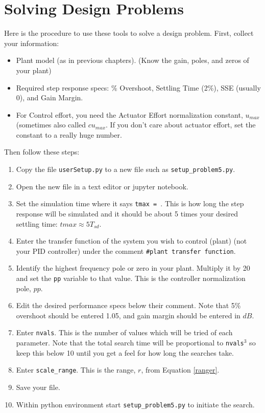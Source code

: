\section{Solving Design Problems}


Here is the procedure to use these tools to solve a design problem.
First, collect your information:
\begin{itemize}
  \item  Plant model (as in previous chapters). (Know the gain, poles, and zeros of your plant)
  \item  Required step response specs:  \% Overshoot, Settling Time (2\%), SSE (usually 0), and Gain Margin.
  \item  For Control effort, you need the Actuator Effort normalization constant, $u_{max}$ (sometimes also called $cu_{max}$.   If you don't care about actuator effort, set the constant to a really huge number.
\end{itemize}

Then follow these steps:	%

\begin{enumerate}
  \item Copy the file {\tt userSetup.py} to a new file such as {\tt setup\_problem5.py}.
  \item Open the new file in a text editor or jupyter notebook.
  \item Set the simulation time where it says {\tt tmax = }.
This is how long the step response will be simulated and it should be about 5 times your desired settling time: $tmax \approx 5T_{sd}$.
  \item Enter the transfer function of the system you wish to control (plant) (not your PID controller) under the comment {\tt \#plant transfer function}.
  \item Identify the highest frequency pole or zero in your plant.  Multiply it by 20 and set the {\tt pp} variable to that value. This is the controller normalization pole, $pp$.
  \item Edit the desired performance specs below their comment.  Note that 5\% overshoot should be entered 1.05, and gain margin should be entered in $dB$.
  \item Enter {\tt nvals}.  This is the number of values which will be tried of each parameter.
Note that the total search time will be proportional to {\tt nvals}$^3$ so keep this below 10 until you get a feel for how long the searches take.
  \item Enter {\tt scale\_range}.  This is the range, $r$, from Equation \ref{ranger}.
  \item Save your file.
  \item Within python environment start {\tt setup\_problem5.py} to initiate the search.
\end{enumerate}


